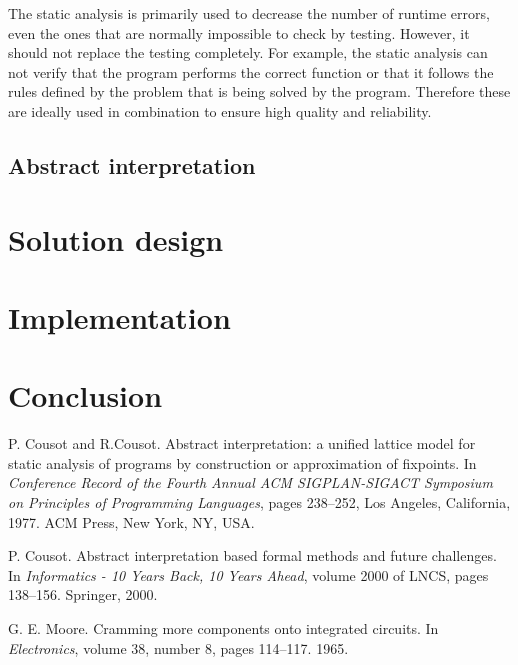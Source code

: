 \documentclass[12pt,final,oneside]{fithesis2}
\begin{document}
\begin{description}
The static analysis is primarily used to decrease the number of runtime
errors, even the ones that are normally impossible to check by testing.
However, it should not replace the testing completely. For example,
the static analysis can not verify that the program performs the correct
function or that it follows the rules defined by the problem that is
being solved by the program. Therefore these are ideally used in
combination to ensure high quality and reliability.


\section{Abstract interpretation}


\chapter{Solution design}
\label{chap:design}


\chapter{Implementation}
\label{chap:implementation}


\chapter{Conclusion}
\label{chap:conclusion}



\begin{thebibliography}{99}

P{.} Cousot and R{.}Cousot.
\newblock Abstract interpretation: a unified lattice model for static
  analysis of programs by construction or approximation of fixpoints.
\newblock In \emph{Conference Record of the Fourth Annual ACM
  SIGPLAN-SIGACT Symposium on Principles of Programming Languages},
  pages 238--252, Los Angeles, California, 1977. ACM Press, New York,
  NY, USA.

P{.} Cousot.
\newblock Abstract interpretation based formal methods and future
  challenges.
\newblock In \emph{Informatics - 10 Years Back, 10 Years Ahead},
  volume 2000 of LNCS, pages 138--156. Springer, 2000.

G{.} E{.} Moore.
\newblock Cramming more components onto integrated circuits.
\newblock In \emph{Electronics}, volume 38, number 8, pages 114--117. 1965.


\end{thebibliography}
\end{description}
\end{document}
